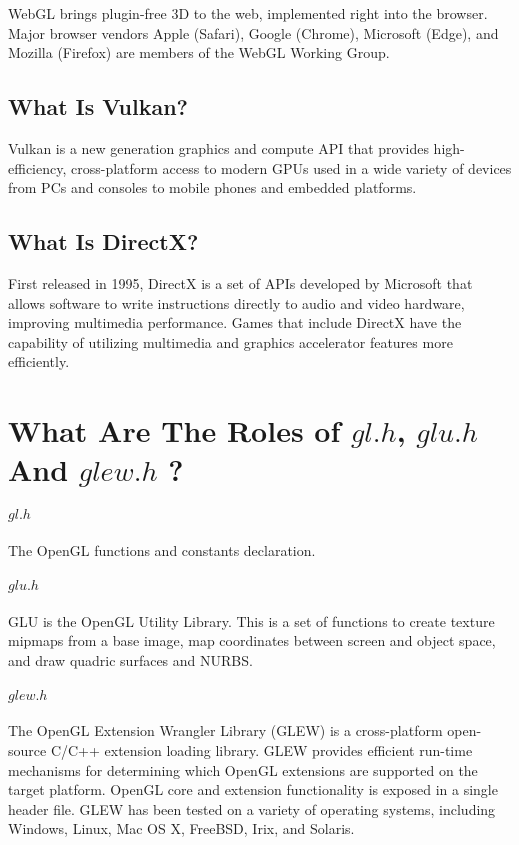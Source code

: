 \documentclass{ctexart}
\begin{document}
WebGL brings plugin-free 3D to the web, implemented right into the browser. Major browser vendors Apple (Safari), Google (Chrome), Microsoft (Edge), and Mozilla (Firefox) are members of the WebGL Working Group.

\subsection{What Is Vulkan?}
Vulkan is a new generation graphics and compute API that provides high-efficiency, cross-platform access to modern GPUs used in a wide variety of devices from PCs and consoles to mobile phones and embedded platforms.

\subsection{What Is DirectX?}
First released in 1995, DirectX is a set of APIs developed by Microsoft that allows software to write instructions directly to audio and video hardware, improving multimedia performance. Games that include DirectX have the capability of utilizing multimedia and graphics accelerator features more efficiently.

\section{What Are The Roles of $gl.h$, $glu.h$ And $glew.h$
?}
\paragraph{$gl.h$}The OpenGL functions and constants declaration.
\paragraph{$glu.h$}GLU is the OpenGL Utility Library. This is a set of functions to create texture mipmaps from a base image, map coordinates between screen and object space, and draw quadric surfaces and NURBS.
\paragraph{$glew.h$}The OpenGL Extension Wrangler Library (GLEW) is a cross-platform open-source C/C++ extension loading library. GLEW provides efficient run-time mechanisms for determining which OpenGL extensions are supported on the target platform. OpenGL core and extension functionality is exposed in a single header file. GLEW has been tested on a variety of operating systems, including Windows, Linux, Mac OS X, FreeBSD, Irix, and Solaris.
\end{document}

